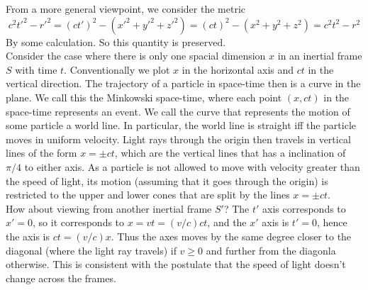 From a more general viewpoint, we consider the metric
$$c^2t'^2-r'^2=(ct')^2-(x'^2+y'^2+z'^2)=(ct)^2-(x^2+y^2+z^2)=c^2t^2-r^2$$
By some calculation.
So this quantity is preserved.\\
Consider the case where there is only one spacial dimension $x$ in an inertial frame $S$ with time $t$.
Conventionally we plot $x$ in the horizontal axis and $ct$ in the vertical direction.
The trajectory of a particle in space-time then is a curve in the plane.
We call this the Minkowski space-time, where each point $(x,ct)$ in the space-time represents an event.
We call the curve that represents the motion of some particle a world line.
In particular, the world line is straight iff the particle moves in uniform velocity.
Light rays through the origin then travels in vertical lines of the form $x=\pm ct$, which are the vertical lines that has a inclination of $\pi/4$ to either axis.
As a particle is not allowed to move with velocity greater than the speed of light, its motion (assuming that it goes through the origin) is restricted to the upper and lower cones that are split by the lines $x=\pm ct$.\\
How about viewing from another inertial frame $S'$?
The $t'$ axis corresponds to $x'=0$, so it corresponds to $x=vt=(v/c)ct$, and the $x'$ axis is $t'=0$, hence the axis is $ct=(v/c)x$.
Thus the axes moves by the same degree closer to the diagonal (where the light ray travels) if $v\ge 0$ and further from the diagonla otherwise.
This is consistent with the postulate that the speed of light doesn't change across the frames.
